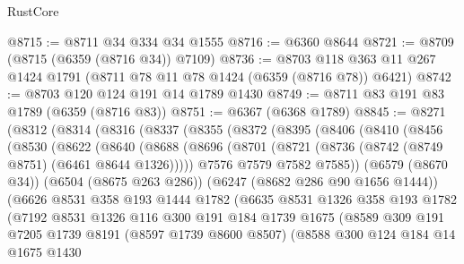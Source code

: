 \begin{lexlean}{RustCore}
\begin{coremodule}
@8715 := @8711 @34 @334 @34 @1555
@8716 := @6360 @8644
@8721 := @8709 (@8715 (@6359 (@8716 @34)) @7109)
@8736 := @8703 @118 @363 @11 @267 @1424 @1791 (@8711 @78 @11 @78 @1424 (@6359 (@8716 @78)) @6421)
@8742 := @8703 @120 @124 @191 @14 @1789 @1430
@8749 := @8711 @83 @191 @83 @1789 (@6359 (@8716 @83))
@8751 := @6367 (@6368 @1789)
@8845 := @8271
    (@8312
      (@8314
        (@8316
          (@8337
            (@8355
              (@8372
                (@8395
                  (@8406
                    (@8410
                      (@8456
                        (@8530
                          (@8622
                            (@8640
                              (@8688
                                (@8696
                                  (@8701 (@8721 (@8736 (@8742 (@8749 @8751) (@6461 @8644 @1326)))))
                                  @7576
                                  @7579
                                  @7582
                                  @7585))
                              (@6579 (@8670 @34))
                              (@6504 (@8675 @263 @286))
                              (@6247 (@8682 @286 @90 @1656 @1444))
                              (@6626
                                @8531
                                @358
                                @193
                                @1444
                                @1782
                                (@6635
                                  @8531
                                  @1326
                                  @358
                                  @193
                                  @1782
                                  (@7192
                                    @8531
                                    @1326
                                    @116
                                    @300
                                    @191
                                    @184
                                    @1739
                                    @1675
                                    (@8589
                                      @309
                                      @191
                                      @7205
                                      @1739
                                      @8191
                                      (@8597 @1739 @8600 @8507)
                                      (@8588
                                        @300
                                        @124
                                        @184
                                        @14
                                        @1675
                                        @1430

\end{coremodule}
\end{lexlean}
